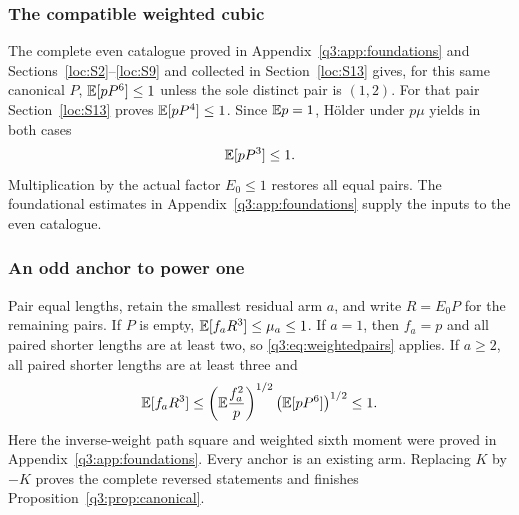 \subsubsection{The compatible weighted cubic}
The complete even catalogue proved in Appendix~\ref{q3:app:foundations} and Sections~\ref{loc:S2}--\ref{loc:S9}
and collected in Section~\ref{loc:S13} gives, for this same canonical $P$,
$\mathbb E[pP^6]\le1$ unless the sole distinct pair is $(1,2)$.
For that pair Section~\ref{loc:S13} proves $\mathbb E[pP^4]\le1$.
Since $\mathbb E p=1$, H\"older under $p\mu$ yields in both cases
\begin{equation}\label{q3:eq:weightedpairs}
 \mathbb E[pP^3]\le1.
\end{equation}
Multiplication by the actual factor $E_0\le1$ restores all equal pairs.
The foundational estimates in Appendix~\ref{q3:app:foundations}
supply the inputs to the even catalogue.

\subsubsection{An odd anchor to power one}
Pair equal lengths, retain the smallest residual arm $a$, and write $R=E_0P$ for the remaining pairs. If $P$ is empty, $\mathbb E[f_aR^3]\le\mu_a\le1$. If $a=1$, then $f_a=p$ and all paired shorter lengths are at least two, so \eqref{q3:eq:weightedpairs} applies. If $a\ge2$, all paired shorter lengths are at least three and
\[
 \mathbb E[f_aR^3]\le
 \left(\mathbb E\frac{f_a^2}{p}\right)^{1/2}
 \left(\mathbb E[pP^6]\right)^{1/2}\le1.
\]
Here the inverse-weight path square and weighted sixth moment were proved in Appendix~\ref{q3:app:foundations}. Every anchor is an existing arm. Replacing $K$ by $-K$ proves the complete reversed statements and finishes Proposition~\ref{q3:prop:canonical}.
